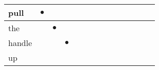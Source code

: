 \documentclass[landscape]{article}
\newcommand{\ssp}{\hspace{2pt}}
\newcommand{\mex}{\cellcolor{g}$\bullet$}
\begin{document}
\begin{tabular}{|l|p{10pt}|p{10pt}|p{10pt}|p{10pt}|p{10pt}|p{10pt}|p{10pt}|p{10pt}|p{10pt}|p{10pt}|p{10pt}|p{10pt}|p{10pt}|}
\hline
\ssp \cellcolor{ref0}pull \ssp&\hspace{2pt}\mex&\hspace{2pt}&\hspace{2pt}&\hspace{2pt}&\hspace{2pt}&\hspace{2pt}&\hspace{2pt}&\hspace{2pt}&\hspace{2pt}&\hspace{2pt}&\hspace{2pt}&\hspace{2pt}&\hspace{2pt}\\
\hline
\ssp \cellcolor{ref1}the \ssp&\hspace{2pt}&\hspace{2pt}\mex&\hspace{2pt}&\hspace{2pt}&\hspace{2pt}&\hspace{2pt}&\hspace{2pt}&\hspace{2pt}&\hspace{2pt}&\hspace{2pt}&\hspace{2pt}&\hspace{2pt}&\hspace{2pt}\\
\hline
\ssp \cellcolor{ref2}handle \ssp&\hspace{2pt}&\hspace{2pt}&\hspace{2pt}\mex&\hspace{2pt}&\hspace{2pt}&\hspace{2pt}&\hspace{2pt}&\hspace{2pt}&\hspace{2pt}&\hspace{2pt}&\hspace{2pt}&\hspace{2pt}&\hspace{2pt}\\
\hline
\ssp up \ssp&\hspace{2pt}&\hspace{2pt}&\hspace{2pt}&\hspace{2pt}&\hspace{2pt}&\hspace{2pt}&\hspace{2pt}&\hspace{2pt}&\hspace{2pt}&\hspace{2pt}&\hspace{2pt}&\hspace{2pt}&\hspace{2pt}\\

\end{tabular}
\end{document}

